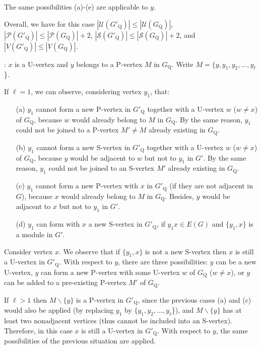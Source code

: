 \documentclass[12pt]{article}
\begin{document}
The same possibilities (a)-(e) are applicable to $y$.

Overall, we have for this case $|{\mathcal U}(G'_{\mathrm Q})| \leq |{\mathcal
U}(G_{\mathrm Q})|$, $|{\mathcal P}(G'_{\mathrm Q})| \leq
|{\mathcal P}(G_{\mathrm Q})|+2$, $|{\mathcal S}(G'_{\mathrm Q})|
\leq |{\mathcal S}(G_{\mathrm Q})|+2$, and $|V(G'_{\mathrm Q})|
\leq |V(G_{\mathrm Q})|$.

\medskip

: $x$ is a U-vertex and $y$ belongs to a
P-vertex $M$ in $G_{\mathrm Q}$.
Write $M=\{y,y_1, y_2, \ldots, y_{\ell}$\}.

If $\ell=1$, we can observe, considering vertex $y_1$, that:
\begin{itemize}
\item[(a)] $y_1$ cannot form a new P-vertex in $G'_{\mathrm Q}$ together with a U-vertex $w$ ($w\not= x$) of $G_{\mathrm Q}$, because $w$ would already belong to $M$ in $G_{\mathrm Q}$. By the same reason, $y_1$ could not be joined to a P-vertex $M' \not= M$ already existing in $G_{\mathrm Q}$.

\item[(b)] $y_1$ cannot form a new S-vertex in $G'_{\mathrm Q}$ together with a U-vertex $w$ ($w\not= x$) of $G_{\mathrm Q}$, because $y$ would be adjacent to $w$ but not to $y_1$ in $G'$. By the same reason, $y_1$ could not be joined to an S-vertex $M'$ already existing in $G_{\mathrm Q}$.

\item[(c)] $y_1$ cannot form a new P-vertex with $x$ in $G'_{\mathrm Q}$ (if they are not adjacent in $G$), because $x$ would already belong to $M$ in $G_{\mathrm Q}$. Besides, $y$ would be adjacent to $x$ but not to $y_1$ in $G'$.

\item[(d)] $y_1$ can form with $x$ a new S-vertex in $G'_{\mathrm Q}$, if $y_1 x \in E(G)$ and $\{y_1,x\}$ is a module in $G'$.
\end{itemize}

Consider vertex $x$. We observe that if $\{y_1, x\}$ is not a new S-vertex then $x$ is still a U-vertex in $G'_{\mathrm Q}$.
With respect to $y$, there are three possibilities: $y$ can be a new U-vertex, $y$ can form a new P-vertex with some U-vertex $w$ of $G_{\mathrm Q}$ ($w \not=x$), or $y$ can be added to a pre-existing P-vertex $M'$ of $G_{\mathrm Q}$.

If $\ell>1$ then $M \backslash \{y\}$ is a P-vertex in $G'_{\mathrm Q}$, since the previous cases (a) and (c) would also be applied (by replacing $y_1$ by $\{y_1, y_2, \ldots, y_{\ell}$\}), and $M \backslash \{y\}$ has at least two nonadjacent vertices (thus cannot be included into an S-vertex). Therefore, in this case $x$ is still a U-vertex in $G'_{\mathrm Q}$. With respect to $y$, the same possibilities of the previous situation are applied.
\end{document}
